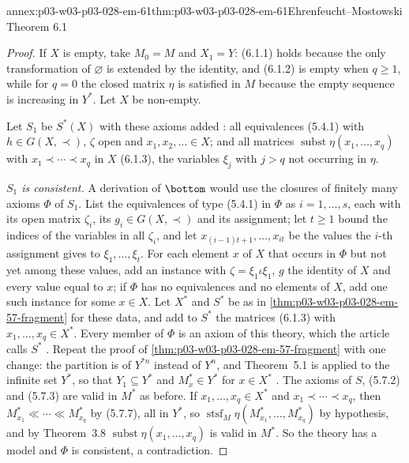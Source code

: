 \begin{annexitem}{annex:p03-w03-p03-028-em-61}{thm:p03-w03-p03-028-em-61}{Ehrenfeucht--Mostowski Theorem 6.1}
\begin{proof}
If \(X\) is empty, take \(M_0=M\) and \(X_1=Y\): (6.1.1) holds because the only
transformation of \(\varnothing\) is extended by the identity, and (6.1.2) is
empty when \(q\geq1\), while for \(q=0\) the closed matrix \(\eta\) is
satisfied in \(M\) because the empty sequence is increasing in \(Y^*\).  Let
\(X\) be non-empty.

Let \(S_1\) be \(S^*(X)\) with these axioms added
\cite[p.~67]{EhrenfeuchtMostowski1956}: all equivalences
(5.4.1) with \(h\in G(X,\prec)\), \(\zeta\) open and
\(x_1,x_2,\ldots\in X\); and all matrices
\(\operatorname{subst}\eta(x_1,\ldots,x_q)\) with
\(x_1\prec\cdots\prec x_q\) in \(X\) (6.1.3), the variables \(\xi_j\) with
\(j>q\) not occurring in \(\eta\).

\emph{\(S_1\) is consistent.}  A derivation of \(\bottom\) would use the closures
of finitely many axioms \(\Phi\) of \(S_1\).  List the equivalences of type
(5.4.1) in \(\Phi\) as \(i=1,\ldots,s\), each with its
open matrix \(\zeta_i\), its \(g_i\in G(X,\prec)\) and its assignment; let
\(t\geq1\) bound the indices of the variables in all \(\zeta_i\), and let
\(x_{(i-1)t+1},\ldots,x_{it}\) be the values the \(i\)-th assignment gives to
\(\xi_1,\ldots,\xi_t\).  For each element \(x\) of \(X\) that occurs in
\(\Phi\) but not yet among these values, add an instance with
\(\zeta=\xi_1\iota\xi_1\), \(g\) the identity of \(X\) and every value equal to
\(x\); if \(\Phi\) has no equivalences and no elements of \(X\), add one such
instance for some \(x\in X\).  Let \(X^*\) and \(S^*\) be as in
\cref{thm:p03-w03-p03-028-em-57-fragment} for these data, and add to \(S^*\) the
matrices (6.1.3) with \(x_1,\ldots,x_q\in X^*\).  Every member of \(\Phi\) is an
axiom of this theory, which the article calls \(S^*\)
\cite[p.~67]{EhrenfeuchtMostowski1956}.  Repeat the proof of
\cref{thm:p03-w03-p03-028-em-57-fragment} with one change: the partition is of
\(Y^{*n}\) instead of \(Y^n\), and Theorem~5.1 is applied to the infinite set
\(Y^*\), so that \(Y_1\subseteq Y^*\) and \(M^*_x\in Y^*\) for \(x\in X^*\)
\cite[p.~67]{EhrenfeuchtMostowski1956}.  The axioms of \(S\), (5.7.2) and
(5.7.3) are valid in \(M^*\) as before.  If \(x_1,\ldots,x_q\in X^*\) and
\(x_1\prec\cdots\prec x_q\), then \(M^*_{x_1}\ll\cdots\ll M^*_{x_q}\) by
(5.7.7), all in \(Y^*\), so
\(\operatorname{stsf}_M\eta(M^*_{x_1},\ldots,M^*_{x_q})\) by hypothesis, and by
Theorem~3.8 \(\operatorname{subst}\eta(x_1,\ldots,x_q)\) is valid in \(M^*\).
So the theory has a model and \(\Phi\) is consistent, a contradiction.


\end{proof}
\end{annexitem}
